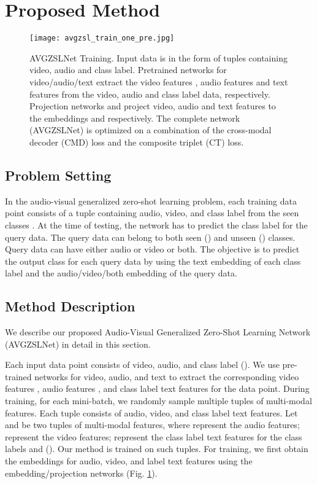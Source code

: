 \documentclass[10pt,twocolumn,letterpaper]{article}
\begin{document}
\section{Proposed Method}\label{sec:method}
\begin{figure}[t]
  \centering
  \texttt{[image: avgzsl\_train\_one\_pre.jpg]}
\caption{AVGZSLNet Training. Input data is in the form of tuples containing video, audio and class label. Pretrained networks for video/audio/text extract the video features , audio features  and text features  from the video, audio and class label data, respectively. Projection networks  and  project video, audio and text features to the embeddings  and  respectively. The complete network (AVGZSLNet) is optimized on a combination of the cross-modal decoder (CMD) loss and the composite triplet (CT) loss.}
\label{fig:train}
  \vspace{-15pt}
\end{figure}


\subsection{Problem Setting}
In the audio-visual generalized zero-shot learning problem, each training data point consists of a tuple containing audio, video, and class label from the seen classes . At the time of testing, the network has to predict the class label for the query data. The query data can belong to both seen () and unseen () classes. Query data can have either audio or video or both. The objective is to predict the output class for each query data by using the text embedding of each class label and the audio/video/both embedding of the query data.


\subsection{Method Description}
We describe our proposed Audio-Visual Generalized Zero-Shot Learning Network (AVGZSLNet) in detail in this section.

Each input data point  consists of video, audio, and class label (). We use pre-trained networks for video, audio, and text to extract the corresponding video features , audio features , and class label text features  for the  data point. During training, for each mini-batch, we randomly sample multiple tuples of multi-modal features. Each tuple consists of audio, video, and class label text features. Let  and  be two tuples of multi-modal features, where  represent the audio features;  represent the video features;  represent the class label text features for the class labels  and  (). Our method is trained on such tuples. For training, we first obtain the embeddings for audio, video, and label text features using the embedding/projection networks (Fig. \ref{fig:train}).
\end{document}
